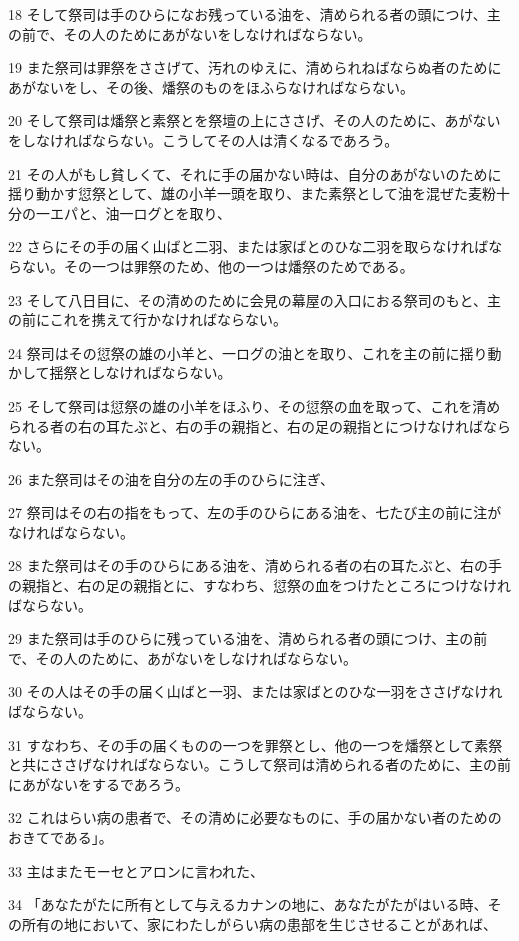 \par 18 そして祭司は手のひらになお残っている油を、清められる者の頭につけ、主の前で、その人のためにあがないをしなければならない。
\par 19 また祭司は罪祭をささげて、汚れのゆえに、清められねばならぬ者のためにあがないをし、その後、燔祭のものをほふらなければならない。
\par 20 そして祭司は燔祭と素祭とを祭壇の上にささげ、その人のために、あがないをしなければならない。こうしてその人は清くなるであろう。
\par 21 その人がもし貧しくて、それに手の届かない時は、自分のあがないのために揺り動かす愆祭として、雄の小羊一頭を取り、また素祭として油を混ぜた麦粉十分の一エパと、油一ログとを取り、
\par 22 さらにその手の届く山ばと二羽、または家ばとのひな二羽を取らなければならない。その一つは罪祭のため、他の一つは燔祭のためである。
\par 23 そして八日目に、その清めのために会見の幕屋の入口におる祭司のもと、主の前にこれを携えて行かなければならない。
\par 24 祭司はその愆祭の雄の小羊と、一ログの油とを取り、これを主の前に揺り動かして揺祭としなければならない。
\par 25 そして祭司は愆祭の雄の小羊をほふり、その愆祭の血を取って、これを清められる者の右の耳たぶと、右の手の親指と、右の足の親指とにつけなければならない。
\par 26 また祭司はその油を自分の左の手のひらに注ぎ、
\par 27 祭司はその右の指をもって、左の手のひらにある油を、七たび主の前に注がなければならない。
\par 28 また祭司はその手のひらにある油を、清められる者の右の耳たぶと、右の手の親指と、右の足の親指とに、すなわち、愆祭の血をつけたところにつけなければならない。
\par 29 また祭司は手のひらに残っている油を、清められる者の頭につけ、主の前で、その人のために、あがないをしなければならない。
\par 30 その人はその手の届く山ばと一羽、または家ばとのひな一羽をささげなければならない。
\par 31 すなわち、その手の届くものの一つを罪祭とし、他の一つを燔祭として素祭と共にささげなければならない。こうして祭司は清められる者のために、主の前にあがないをするであろう。
\par 32 これはらい病の患者で、その清めに必要なものに、手の届かない者のためのおきてである」。
\par 33 主はまたモーセとアロンに言われた、
\par 34 「あなたがたに所有として与えるカナンの地に、あなたがたがはいる時、その所有の地において、家にわたしがらい病の患部を生じさせることがあれば、
